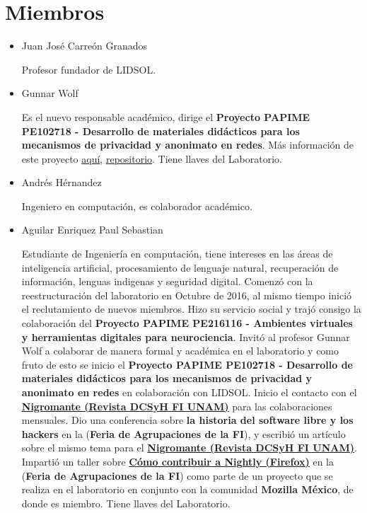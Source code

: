 \documentclass[a4paper,11pt]{article}                 %
\begin{document}
  \section{Miembros}
  \begin{itemize}
    \item Juan José Carreón Granados
    
    Profesor fundador de LIDSOL.
    
    \item Gunnar Wolf 
    
    Es el nuevo responsable académico, dirige el \textbf{Proyecto PAPIME PE102718 - Desarrollo de materiales didácticos para los mecanismos de privacidad y anonimato en redes}. Más información de este proyecto \href{https://www.priv-anon.unam.mx/}{aquí}, \href{https://github.com/LIDSOL/papime-pe102718-mecanismos-de-privacidad-y-anonimato}{repositorio}. Tiene llaves del Laboratorio.
    
    \item Andrés Hérnandez
    
    Ingeniero en computación, es colaborador académico.
    
    \item Aguilar Enriquez Paul Sebastian
    
    Estudiante de Ingeniería en computación, tiene intereses en las áreas de inteligencia artificial, procesamiento de lenguaje natural, recuperación de información, lenguas indigenas y seguridad digital. Comenzó con la reestructuración del laboratorio en Octubre de 2016, al mismo tiempo inició el reclutamiento de nuevos miembros.  Hizo su servicio social y trajó consigo la colaboración del  \textbf{Proyecto PAPIME PE216116 - Ambientes virtuales y herramientas digitales para neurociencia}. Invitó al profesor Gunnar Wolf a colaborar de manera formal y académica en el laboratorio y como fruto de esto se inicio el \textbf{Proyecto PAPIME PE102718 - Desarrollo de materiales didácticos para los mecanismos de privacidad y anonimato en redes} en colaboración con LIDSOL. Inicio el contacto con el \href{https://issuu.com/nigromantefi}{\textbf{Nigromante  (Revista DCSyH FI  UNAM)}} para las colaboraciones mensuales. Dio una conferencia sobre \textbf{la historia del software libre y los hackers} en la (\textbf{Feria de Agrupaciones de la FI}), y escribió un artículo sobre el mismo tema para el \href{https://issuu.com/nigromantefi}{\textbf{Nigromante  (Revista DCSyH FI  UNAM)}}. Impartió un taller sobre \href{https://github.com/LIDSOL/nightlynight}{\textbf{Cómo contribuir a Nightly (Firefox)}} en la (\textbf{Feria de Agrupaciones de la FI}) como parte de un proyecto que se realiza en el laboratorio en conjunto con la comunidad \textbf{Mozilla México}, de donde es miembro. Tiene llaves del Laboratorio.
    

\end{itemize}
\end{document}
